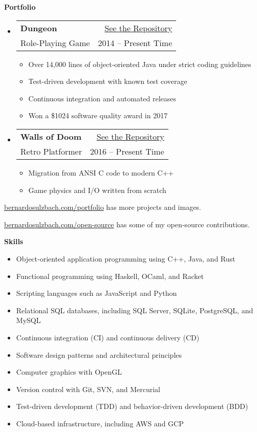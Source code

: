 \documentclass[10pt]{article}
\makeatletter
\newcommand{\resitem}[1]{\item #1}
\newcommand{\resheading}[1]{
  \vspace{10pt}
  \textbf{\large #1}
  \vspace{4pt}
}
\newcommand{\ressubheading}[4]{
\begin{tabularx}{\linewidth}{X<{\cftdotfill{\cftsecdotsep}}@{}r}
  \textbf{#1} & #2 \\
           #3 & #4 \\
\end{tabularx}\vspace{-4pt}}
\makeatother
\begin{document}
\resheading{Portfolio}
\begin{itemize}
    \resitem
        \ressubheading{Dungeon}{\href{https://github.com/bernardosulzbach/dungeon/}{See the Repository}}{Role-Playing Game}{2014 -- Present Time}
        \begin{itemize}
            \resitem Over 14,000 lines of object-oriented Java under strict coding guidelines
            \resitem Test-driven development with known test coverage
            \resitem Continuous integration and automated releases
            \resitem Won a \$1024 software quality award in 2017
        \end{itemize}
    \resitem
        \ressubheading{Walls of Doom}{\href{https://github.com/bernardosulzbach/walls-of-doom/}{See the Repository}}{Retro Platformer}{2016 -- Present Time}
        \begin{itemize}
            \resitem Migration from ANSI C code to modern C++
            \resitem Game physics and I/O written from scratch
        \end{itemize}
\end{itemize}

\href{https://www.bernardosulzbach.com/portfolio/}{bernardosulzbach.com/portfolio} has more projects and images.

\href{https://www.bernardosulzbach.com/open-source/}{bernardosulzbach.com/open-source} has some of my open-source contributions.

\resheading{Skills}
\begin{itemize}
    \setlength\itemsep{0em}
    \resitem Object-oriented application programming using C++, Java, and Rust
    \resitem Functional programming using Haskell, OCaml, and Racket
    \resitem Scripting languages such as JavaScript and Python
    \resitem Relational SQL databases, including SQL Server, SQLite, PostgreSQL, and MySQL
    \resitem Continuous integration (CI) and continuous delivery (CD)
    \resitem Software design patterns and architectural principles
    \resitem Computer graphics with OpenGL
    \resitem Version control with Git, SVN, and Mercurial
    \resitem Test-driven development (TDD) and behavior-driven development (BDD)
    \resitem Cloud-based infrastructure, including AWS and GCP
\end{itemize}
\end{document}
